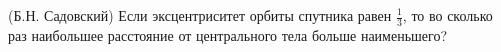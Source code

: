 (Б.Н. Садовский)
Если эксцентриситет орбиты спутника равен $\frac{1}{3}$, то во сколько
раз наибольшее расстояние от центрального тела больше наименьшего?
